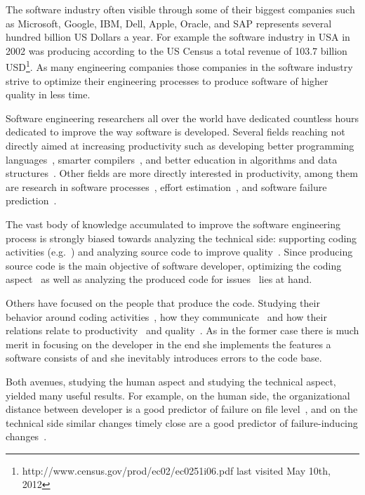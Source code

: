The software industry often visible through some of their biggest companies such as Microsoft, Google, IBM, Dell, Apple, Oracle, and SAP represents several hundred billion US Dollars a year. 
For example the software industry in USA in 2002 was producing according to the US Census a total revenue of 103.7 billion USD\footnote{http://www.census.gov/prod/ec02/ec0251i06.pdf last visited May 10th, 2012}.
As many engineering companies those companies in the software industry strive to optimize their engineering processes to produce software of higher quality in less time.

Software engineering researchers all over the world have dedicated countless hours dedicated to improve the way software is developed.
Several fields reaching not directly aimed at increasing productivity such as developing better programming languages~\cite{conf:prog:lang}, smarter compilers~\cite{cong:comp:constr}, and better education in algorithms and data structures~\cite{conf:sigcse}.
Other fields are more directly interested in productivity, among them are research in software processes~\cite{conf:icssp}, effort estimation~\cite{molkken:isese:2003,boehm:analse:2000}, and software failure prediction~\cite{conf:promise}.

The vast body of knowledge accumulated to improve the software engineering process is strongly biased towards analyzing the technical side: supporting coding activities (e.g.~\cite{bassil:iwpc:2001,mens:tse:2004}) and analyzing source code to improve quality~\cite{zimmermann:oopsla:2005,nagappan:icse:2006}. 
Since producing source code is the main objective of software developer, optimizing the coding aspect~\cite{bassil:iwpc:2001,mens:tse:2004} as well as analyzing the produced code for issues~\cite{nagappan:icse:2005,schroeter:isese:2006} lies at hand.

Others have focused on the people that produce the code. Studying their behavior around coding activities~\cite{latoza:icse:2006}, how they communicate~\cite{ko:icse:2007,gopal:2002:comacm} and how their relations relate to productivity~\cite{gopal:2002:comacm} and quality~\cite{abreu:iwpse:2009,wolf:icse:2009}.
As in the former case there is much merit in focusing on the developer in the end she implements the features a software consists of and she inevitably introduces errors to the code base.

Both avenues, studying the human aspect and studying the technical aspect, yielded many useful results.
For example, on the human side, the organizational distance between developer is a good predictor of failure on file level~\cite{nagappan:icse:2008}, and on the technical side similar changes timely close are a good predictor of failure-inducing changes~\cite{kim:icse:2007}.

